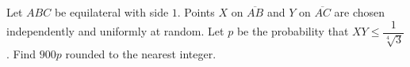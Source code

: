 Let $ABC$ be equilateral with side $1$. Points $X$ on $\overline{AB}$ and $Y$ on $\overline{AC}$ are chosen independently and uniformly at random. Let $p$ be the probability that $XY\le\dfrac{1}{\sqrt[4]3}$. Find $900p$ rounded to the nearest integer.
